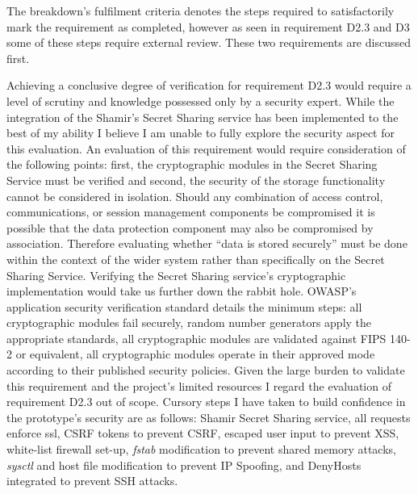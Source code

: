 The breakdown's fulfilment criteria denotes the steps required to satisfactorily mark the requirement as completed, however as seen in requirement D2.3 and D3 some of these steps require external review. These two requirements are discussed first.

Achieving a conclusive degree of verification for requirement D2.3 would require a level of scrutiny and knowledge possessed only by a security expert. While the integration of the Shamir's Secret Sharing service has been implemented to the best of my ability I believe I am unable to fully explore the security aspect for this evaluation. An evaluation of this requirement would require consideration of the following points: first, the cryptographic modules in the Secret Sharing Service must be verified and second, the security of the storage functionality cannot be considered in isolation. Should any combination of access control, communications, or session management components be compromised it is possible that the data protection component may also be compromised by association. Therefore evaluating whether ``data is stored securely'' must be done within the context of the wider system rather than specifically on the Secret Sharing Service. Verifying the Secret Sharing service's cryptographic implementation would take us further down the rabbit hole. OWASP's application security verification standard \cite{OWASP:online} details the minimum steps: all cryptographic modules fail securely, random number generators apply the appropriate standards, all cryptographic modules are validated against FIPS 140-2 or equivalent, all cryptographic modules operate in their approved mode according to their published security policies. Given the large burden to validate this requirement and the project's limited resources I regard the evaluation of requirement D2.3 out of scope. Cursory steps I have taken to build confidence in the prototype's security are as follows: Shamir Secret Sharing service, all requests enforce ssl, CSRF tokens to prevent CSRF, escaped user input to prevent XSS, 
white-list firewall set-up, \textit{fstab} modification to prevent shared memory attacks, \textit{sysctl} and host file modification to prevent IP Spoofing, and DenyHosts \cite{DenyH6:online} integrated to prevent SSH attacks.

